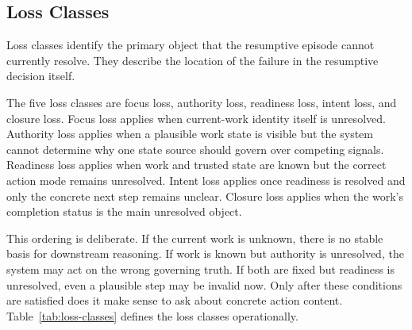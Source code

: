 \documentclass[a4paper,fleqn]{cas-dc}
\begin{document}
\enlargethispage{-3\baselineskip}
\subsection{Loss Classes}

Loss classes identify the primary object that the resumptive episode cannot currently resolve. They describe the location of the failure in the resumptive decision itself.

The five loss classes are focus loss, authority loss, readiness loss, intent loss, and closure loss. Focus loss applies when current-work identity itself is unresolved. Authority loss applies when a plausible work state is visible but the system cannot determine why one state source should govern over competing signals. Readiness loss applies when work and trusted state are known but the correct action mode remains unresolved. Intent loss applies once readiness is resolved and only the concrete next step remains unclear. Closure loss applies when the work's completion status is the main unresolved object.

This ordering is deliberate. If the current work is unknown, there is no stable basis for downstream reasoning. If work is known but authority is unresolved, the system may act on the wrong governing truth. If both are fixed but readiness is unresolved, even a plausible step may be invalid now. Only after these conditions are satisfied does it make sense to ask about concrete action content. Table~\ref{tab:loss-classes} defines the loss classes operationally.
\end{document}
